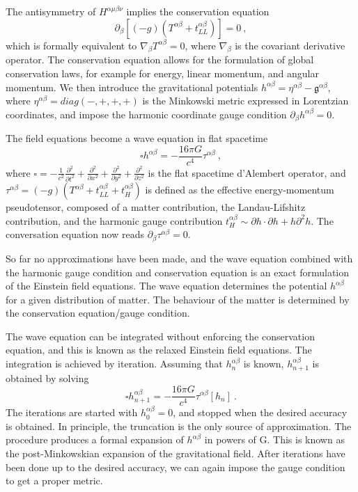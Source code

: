 \documentclass[english, oneside]{HYgradu}
\begin{document}
The antisymmetry of $H^{\alpha \mu \beta \nu}$ implies the conservation equation
\begin{equation}
\partial_\beta \left[ (-g)(T^{\alpha \beta} + t^{\alpha \beta}_{LL}) \right] = 0 \ ,
\end{equation}
which is formally equivalent to $\nabla_\beta T^{\alpha \beta} = 0$, where $\nabla_\beta$ is the covariant derivative operator. The conservation equation allows for the formulation of global conservation laws, for example for energy, linear momentum, and angular momentum. We then introduce the gravitational potentials $h^{\alpha \beta} = \eta^{\alpha \beta} - \mathfrak{g}^{\alpha \beta}$, where $\eta^{\alpha \beta} = diag(-,+,+,+)$ is the Minkowski metric expressed in Lorentzian coordinates, and impose the harmonic coordinate gauge condition $\partial_\beta h^{\alpha \beta} = 0$.

The field equations become a wave equation in flat spacetime
\begin{equation} \label{equ:waveeq}
\square h^{\alpha \beta} = -\frac{16 \pi G}{c^4} \tau^{\alpha \beta} \ ,
\end{equation}
where $\square = -\frac{1}{c^2} \frac{\partial^2}{\partial t^2} + \frac{\partial^2}{\partial x^2} + \frac{\partial^2}{\partial y^2} + \frac{\partial^2}{\partial z^2}$ is the flat spacetime d'Alembert operator, and $\tau^{\alpha \beta} = (-g)(T^{\alpha \beta} + t^{\alpha \beta}_{LL} + t^{\alpha \beta}_H)$ is defined as the effective energy-momentum pseudotensor, composed of a matter contribution, the Landau-Lifshitz contribution, and the harmonic gauge contribution $t^{\alpha \beta}_H \sim \partial h \cdot \partial h + h \partial^2 h$. The conversation equation now reads $\partial_\beta \tau^{\alpha \beta} = 0$.

So far no approximations have been made, and the wave equation combined with the harmonic gauge condition and conservation equation is an exact formulation of the Einstein field equations. The wave equation determines the potential $h^{\alpha \beta}$ for a given distribution of matter. The behaviour of the matter is determined by the conservation equation/gauge condition.

The wave equation can be integrated without enforcing the conservation equation, and this is known as the relaxed Einstein field equations. The integration is achieved by iteration. Assuming that $h^{\alpha \beta}_n$ is known, $h^{\alpha \beta}_{n+1}$ is obtained by solving
\begin{equation}
\square h^{\alpha \beta}_{n+1} = -\frac{16 \pi G}{c^4} \tau^{\alpha \beta}[h_n] \ .
\end{equation}
The iterations are started with $h^{\alpha \beta}_0 = 0$, and stopped when the desired accuracy is obtained. In principle, the truncation is the only source of approximation. The procedure produces a formal expansion of $h^{\alpha \beta}$ in powers of G. This is known as the post-Minkowskian expansion of the gravitational field. After iterations have been done up to the desired accuracy, we can again impose the gauge condition to get a proper metric.
\end{document}

